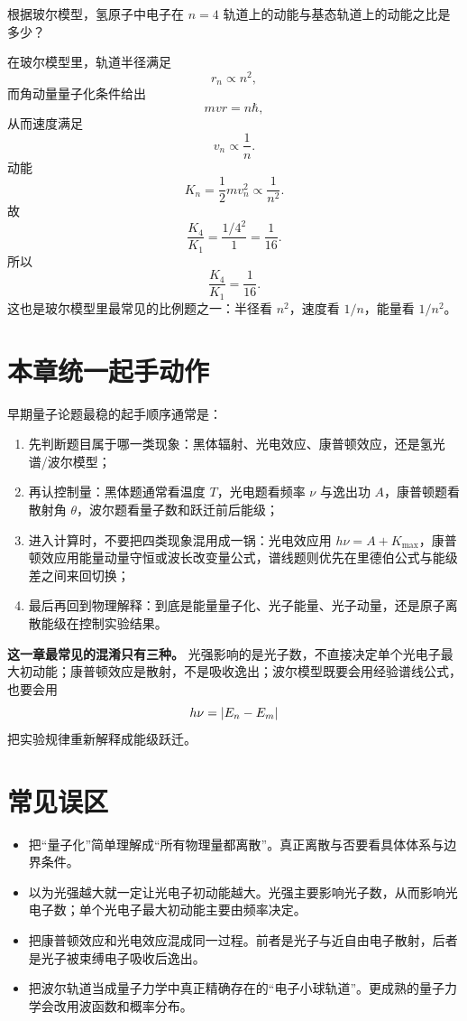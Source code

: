 \documentclass[lang=cn,11pt]{elegantbook}
\begin{document}
\begin{example}[玻尔模型中 \(n=4\) 与基态的动能比]
根据玻尔模型，氢原子中电子在 \(n=4\) 轨道上的动能与基态轨道上的动能之比是多少？
\end{example}

\begin{solution}
在玻尔模型里，轨道半径满足
\[
r_n\propto n^2,
\]
而角动量量子化条件给出
\[
mvr=n\hbar,
\]
从而速度满足
\[
v_n\propto \frac{1}{n}.
\]
动能
\[
K_n=\frac12 mv_n^2\propto \frac{1}{n^2}.
\]
故
\[
\frac{K_4}{K_1}=\frac{1/4^2}{1}=\frac{1}{16}.
\]
所以
\[
\boxed{\frac{K_4}{K_1}=\frac{1}{16}.}
\]
这也是玻尔模型里最常见的比例题之一：半径看 \(n^2\)，速度看 \(1/n\)，能量看 \(1/n^2\)。
\end{solution}

\section{本章统一起手动作}

早期量子论题最稳的起手顺序通常是：
\begin{enumerate}
  \item 先判断题目属于哪一类现象：黑体辐射、光电效应、康普顿效应，还是氢光谱/波尔模型；
  \item 再认控制量：黑体题通常看温度 \(T\)，光电题看频率 \(\nu\) 与逸出功 \(A\)，康普顿题看散射角 \(\theta\)，波尔题看量子数和跃迁前后能级；
  \item 进入计算时，不要把四类现象混用成一锅：光电效应用 \(h\nu=A+K_{\max}\)，康普顿效应用能量动量守恒或波长改变量公式，谱线题则优先在里德伯公式与能级差之间来回切换；
  \item 最后再回到物理解释：到底是能量量子化、光子能量、光子动量，还是原子离散能级在控制实验结果。
\end{enumerate}

\begin{note}
\textbf{这一章最常见的混淆只有三种。} 光强影响的是光子数，不直接决定单个光电子最大初动能；康普顿效应是散射，不是吸收逸出；波尔模型既要会用经验谱线公式，也要会用
\[
h\nu=\abs{E_n-E_m}
\]
把实验规律重新解释成能级跃迁。
\end{note}

\section{常见误区}

\begin{itemize}
  \item 把“量子化”简单理解成“所有物理量都离散”。真正离散与否要看具体体系与边界条件。
  \item 以为光强越大就一定让光电子初动能越大。光强主要影响光子数，从而影响光电子数；单个光电子最大初动能主要由频率决定。
  \item 把康普顿效应和光电效应混成同一过程。前者是光子与近自由电子散射，后者是光子被束缚电子吸收后逸出。
  \item 把波尔轨道当成量子力学中真正精确存在的“电子小球轨道”。更成熟的量子力学会改用波函数和概率分布。
\end{itemize}
\end{document}
